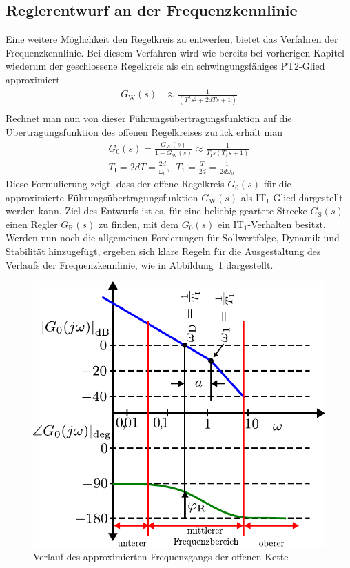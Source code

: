 \subsection{Reglerentwurf an der Frequenzkennlinie}
%
Eine weitere Möglichkeit den Regelkreis zu entwerfen, bietet das Verfahren der Frequenzkennlinie. Bei diesem Verfahren wird wie bereits bei vorherigen Kapitel wiederum der geschlossene Regelkreis als ein schwingungsfähiges PT2-Glied approximiert 
%
\begin{equation*}
\begin{aligned}
%
G_{\text{W}}(s)&\approx \frac{1}{\left(T^{2}s^{2}+2dTs+1\right)}\\
%
\end{aligned}
\end{equation*}
%
Rechnet man nun von dieser Führungsübertragungsfunktion auf die Übertragungsfunktion des offenen Regelkreises zurück erhält man
%
\begin{equation}
\begin{aligned}
%
G_{0}(s)=\frac{G_{\text{W}}(s)}{1-G_{\text{W}}(s)}\approx \frac{1}{T_{\text{I}}s\left(T_{1}s+1\right)}\label{eq:offeneFrequenz}\\
%
T_{\text{I}}=2dT=\frac{2d}{\omega_{0}},\,\,\,T_{1}=\frac{T}{2d}=\frac{1}{2d\omega_{0}}.
%
\end{aligned}
\end{equation}
%
Diese Formulierung zeigt, dass der offene Regelkreis $G_{0}(s)$ für die approximierte Führungsübertragungsfunktion $G_{\text{W}}(s)$ als IT$_{1}$-Glied dargestellt werden kann. Ziel des Entwurfs ist es, für eine beliebig geartete Strecke $G_{\text{S}}(s)$ einen Regler  $G_{\text{R}}(s)$ zu finden, mit dem $G_{0}(s)$ ein IT$_{1}$-Verhalten besitzt. Werden nun noch die allgemeinen Forderungen für Sollwertfolge, Dynamik und Stabilität hinzugefügt, ergeben sich klare Regeln für die Ausgestaltung des Verlaufs der Frequenzkennlinie, wie in Abbildung~\ref{fig:FrquenzEntwurf} dargestellt.  
%
\begin{figure}[h]
	\centering
	\includegraphics[width=0.6\linewidth]{Abbildungen/Reglerentwurf/PDF/Frequenzkennlinienverfahren.pdf}
	\caption{Verlauf des approximierten Frequenzgangs der offenen Kette}
	\label{fig:FrquenzEntwurf}
\end{figure}
